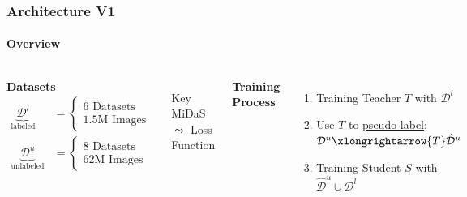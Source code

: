 \documentclass[12pt]{beamer}
\begin{document}
\begin{frame}
    \frametitle{Architecture V1}
    \framesubtitle{Overview}
    
    \begin{columns}
        
        
        \textbf{Datasets}
        \begin{equation*}
            \begin{aligned}
                \underbrace{\mathcal{D}^l}_{\text{labeled}} &= 
                \begin{cases} 
                    \text{6 Datasets} \\ 
                    \text{1.5M Images} 
                \end{cases} \\
                \underbrace{\mathcal{D}^u}_{\text{unlabeled}} &= 
                \begin{cases} 
                    \text{8 Datasets} \\ 
                    \text{62M Images} 
                \end{cases}
            \end{aligned}
        \end{equation*}
        \pause
        \begin{itemize}
            \item[Key] MiDaS $\leadsto$ Loss Function
        \end{itemize}
        
        
        \pause
        \textbf{Training Process}
        \begin{enumerate}
            \item<4-> Training Teacher $T$ with $\mathcal{D}^l$
            
            \item<5-> Use $T$ to \underline{pseudo-label}:
            \\$\mathcal{D}^u \xlongrightarrow{T} \hat{\mathcal{D}}^u $
            
            \item<6-> Training Student $S$ with $\hat{\mathcal{D}}^u \cup \mathcal{D}^l$
        \end{enumerate}
    
    \end{columns}
\end{frame}
\end{document}

